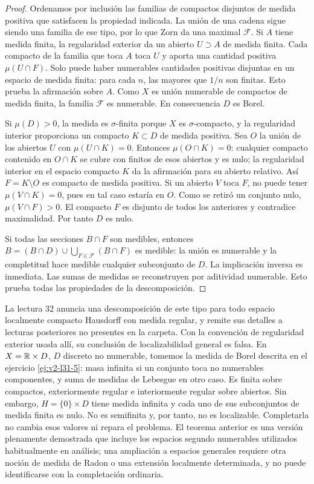 \begin{proof}
Ordenamos por inclusión las familias de compactos disjuntos de medida positiva que satisfacen la propiedad indicada. La unión de una cadena sigue siendo una familia de ese tipo, por lo que Zorn da una maximal $\mathcal F$. Si $A$ tiene medida finita, la regularidad exterior da un abierto $U\supset A$ de medida finita. Cada compacto de la familia que toca $A$ toca $U$ y aporta una cantidad positiva $\mu(U\cap F)$. Solo puede haber numerables cantidades positivas disjuntas en un espacio de medida finita: para cada $n$, las mayores que $1/n$ son finitas. Esto prueba la afirmación sobre $A$. Como $X$ es unión numerable de compactos de medida finita, la familia $\mathcal F$ es numerable. En consecuencia $D$ es Borel.

Si $\mu(D)>0$, la medida es $\sigma$-finita porque $X$ es $\sigma$-compacto, y la regularidad interior proporciona un compacto $K\subset D$ de medida positiva. Sea $O$ la unión de los abiertos $U$ con $\mu(U\cap K)=0$. Entonces $\mu(O\cap K)=0$: cualquier compacto contenido en $O\cap K$ se cubre con finitos de esos abiertos y es nulo; la regularidad interior en el espacio compacto $K$ da la afirmación para su abierto relativo. Así $F=K\setminus O$ es compacto de medida positiva. Si un abierto $V$ toca $F$, no puede tener $\mu(V\cap K)=0$, pues en tal caso estaría en $O$. Como se retiró un conjunto nulo, $\mu(V\cap F)>0$. El compacto $F$ es disjunto de todos los anteriores y contradice maximalidad. Por tanto $D$ es nulo.

Si todas las secciones $B\cap F$ son medibles, entonces $B=(B\cap D)\cup\bigcup_{F\in\mathcal F}(B\cap F)$ es medible: la unión es numerable y la completitud hace medible cualquier subconjunto de $D$. La implicación inversa es inmediata. Las sumas de medidas se reconstruyen por aditividad numerable. Esto prueba todas las propiedades de la descomposición.
\end{proof}
\begin{observacion}
La lectura 32 anuncia una descomposición de este tipo para todo espacio localmente compacto Hausdorff con medida regular, y remite sus detalles a lecturas posteriores no presentes en la carpeta. Con la convención de regularidad exterior usada allí, su conclusión de localizabilidad general es falsa. En $X=\mathbb R\times D$, $D$ discreto no numerable, tomemos la medida de Borel descrita en el ejercicio \ref{ej:v2-l31-5}: masa infinita si un conjunto toca no numerables componentes, y suma de medidas de Lebesgue en otro caso. Es finita sobre compactos, exteriormente regular e interiormente regular sobre abiertos. Sin embargo, $H=\{0\}\times D$ tiene medida infinita y cada uno de sus subconjuntos de medida finita es nulo. No es semifinita y, por tanto, no es localizable. Completarla no cambia esos valores ni repara el problema. El teorema anterior es una versión plenamente demostrada que incluye los espacios segundo numerables utilizados habitualmente en análisis; una ampliación a espacios generales requiere otra noción de medida de Radon o una extensión localmente determinada, y no puede identificarse con la completación ordinaria.
\end{observacion}

